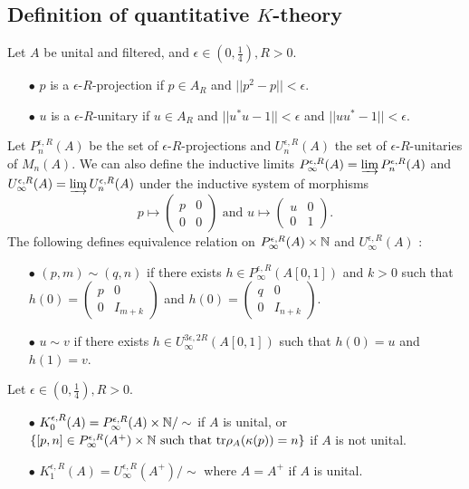 \subsection{Definition of quantitative $K$-theory} 

Let $A$ be unital and filtered, and $\epsilon\in (0,\frac{1}{4}),R>0$.
\begin{itemize}
\item[$\bullet$] $p$ is a $\epsilon$-$R$-projection if $p\in A_R$ and $||p^2-p||<\epsilon$.
\item[$\bullet$] $u$ is a $\epsilon$-$R$-unitary if $u\in A_R$ and $||u^*u-1||<\epsilon$ and $||uu^*-1||<\epsilon$.\\
\end{itemize}

Let $P^{\epsilon, R}_n(A)$ be the set of $\epsilon$-$R$-projections and $U^{\epsilon,R}_n(A)$ the set of $\epsilon$-$R$-unitaries of $M_n(A)$. We can also define the inductive limits $P^{\epsilon, R}_\infty(A)=\varinjlim P^{\epsilon,R}_n(A)$ and $U^{\epsilon, R}_\infty(A)=\varinjlim U^{\epsilon,R}_n(A)$ under the inductive system of morphisms 
\[p\mapsto \begin{pmatrix} p & 0 \\0 & 0\end{pmatrix}\text{ and }u\mapsto \begin{pmatrix} u & 0 \\0 & 1\end{pmatrix}.\]
 The following defines equivalence relation on $P^{\epsilon,R}_\infty(A)\times \mathbb N$ and $U_\infty^{\epsilon,R}(A)$ :
\begin{itemize}
\item[$\bullet$] $(p,m)\sim (q,n)$ if there exists $h\in P^{\epsilon,R}_\infty(A[0,1])$ and $k>0$ such that $h(0)=\begin{pmatrix} p & 0 \\0 & I_{m+k}\end{pmatrix}$ and $h(0)=\begin{pmatrix} q & 0 \\0 & I_{n+k}\end{pmatrix}$.
\item[$\bullet$] $u\sim v$ if there exists $h\in U^{3\epsilon,2R}_\infty(A[0,1])$ such that $h(0)=u$ and $h(1)=v$.
\end{itemize}

\begin{definition}
Let $\epsilon\in (0,\frac{1}{4}),R>0$.\\
\begin{itemize}
\item[$\bullet$] $K_0^{\epsilon,R}(A)=P_\infty^{\epsilon,R}(A)\times\mathbb N / \sim$ if $A$ is unital, or $\{[p,n]\in P^{\epsilon,R}_\infty(A^+)\times\mathbb N\text{ such that tr}\rho_A(\kappa (p))=n\}$ if $A$ is not unital.
\item[$\bullet$] $K_1^{\epsilon,R}(A)=U^{\epsilon,R}_\infty(A^+)/\sim$ where $A=A^+$ if $A$ is unital.
\end{itemize}
\end{definition}

